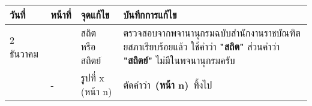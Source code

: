 \begin{table}[ht!]
    \centering
    \begin{tabularx}{\textwidth}{|l|l|l|X|}
        \hline
        \rowcolor{LightGray} 
        {\bf วันที่}   & {\bf หน้าที่}                    & {\bf จุดแก้ไข}          & {\bf บันทึกการแก้ไข} \\ \hline
        2 ธันวาคม    & \pageref{sec:introduction}    & สถิต หรือ สถิตย์          & ตรวจสอบจากพจานานุกรมฉบับสำนักงานราชบัณฑิตยสภาเรียบร้อยแล้ว 
                                              ใช้คำว่า {\bf "สถิต"} ส่วนคำว่า {\bf "สถิตย์"} ไม่มีในพจนานุกรมครับ \\ \hline
                    & -                             & รูปที่ x (หน้า n)         & ตัดคำว่า\ {\bf (หน้า n)}\ ทิ้งไป \\ \hline
    \end{tabularx}
\end{table}
